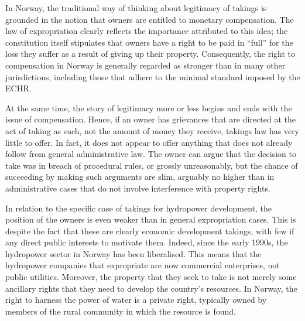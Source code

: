 In Norway, the traditional way of thinking about legitimacy of takings is grounded in the notion that owners are entitled to monetary compensation. The law of expropriation clearly reflects the importance attributed to this idea; the constitution itself stipulates that owners have a right to be paid in ``full'' for the loss they suffer as a result of giving up their property. Consequently, the right to compensation in Norway is generally regarded as stronger than in many other jurisdictions, including those that adhere to the minimal standard imposed by the ECHR.

At the same time, the story of legitimacy more or less begins and ends with the issue of compensation. Hence, if an owner has grievances that are directed at the act of taking as such, not the amount of money they receive, takings law has very little to offer. In fact, it does not appear to offer anything that does not already follow from general administrative law. The owner can argue that the decision to take was in breach of procedural rules, or grossly unreasonably, but the chance of succeeding by making such arguments are slim, arguably no higher than in administrative cases that do not involve interference with property rights.


In relation to the specific case of takings for hydropower development, the position of the owners is even weaker than in general expropriation cases. This is despite the fact that these are clearly economic development takings, with few if any direct public interests to motivate them. Indeed, since the early 1990s, the hydropower sector in Norway has been liberalised. This means that the hydropower companies that expropriate are now commercial enterprises, not public utilities. Moreover, the property that they seek to take is not merely some ancillary rights that they need to develop the country's resources. In Norway, the right to harness the power of water is a private right, typically owned by members of the rural community in which the resource is found.

